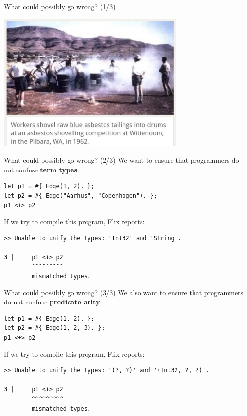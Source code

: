 \begin{frame}{What could possibly go wrong? (1/3)}
\begin{center}
    \includegraphics[width=0.7\textwidth]{img/asbestos.jpg}
\end{center}
\end{frame}  

\begin{frame}[fragile]{What could possibly go wrong? (2/3)}
We want to ensure that programmers do not confuse \textbf{term types}:

\begin{lstlisting}[language=flix, xleftmargin=0.8cm]
let p1 = #{ Edge(1, 2). };
let p2 = #{ Edge("Aarhus", "Copenhagen"). };
p1 <+> p2
\end{lstlisting}

If we try to compile this program, Flix reports:

\begin{lstlisting}[language=flix, xleftmargin=0.8cm]
>> Unable to unify the types: 'Int32' and 'String'.

3 |     p1 <+> p2
        ^^^^^^^^^
        mismatched types.
\end{lstlisting}
\end{frame}

\begin{frame}[fragile]{What could possibly go wrong? (3/3)}
We also want to ensure that programmers do not confuse \textbf{predicate arity}:

\begin{lstlisting}[language=flix, xleftmargin=0.8cm]
let p1 = #{ Edge(1, 2). };
let p2 = #{ Edge(1, 2, 3). };
p1 <+> p2
\end{lstlisting}

If we try to compile this program, Flix reports:

\begin{lstlisting}[language=flix, xleftmargin=0.8cm]
>> Unable to unify the types: '(?, ?)' and '(Int32, ?, ?)'.

3 |     p1 <+> p2
        ^^^^^^^^^
        mismatched types.

\end{lstlisting}
\end{frame}

